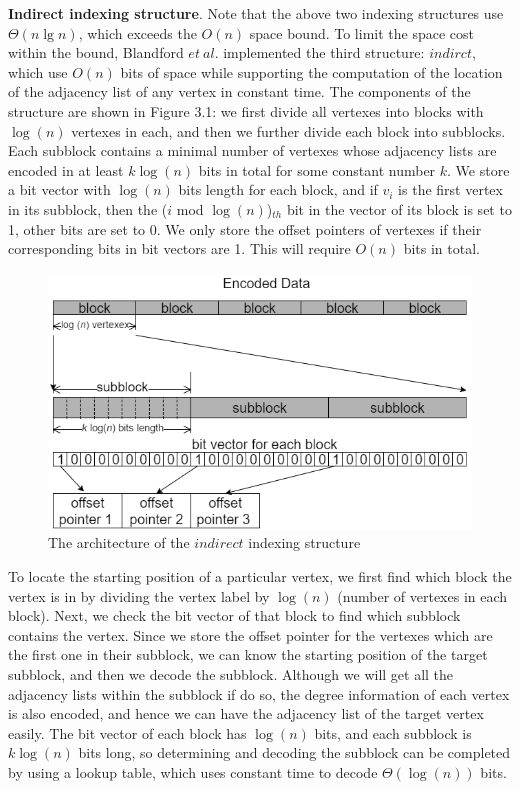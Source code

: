 \documentclass[12pt,glossary]{dalthesis}
\begin{document}
\textbf{Indirect indexing structure}. Note that the above two indexing structures use $ \Theta (n\lg n)$, which exceeds the $O(n)$ space bound. To limit the space cost within the bound, Blandford $et \ al.$ implemented the third structure: $indirct$, which use $O(n)$ bits of space while supporting the computation of the location of the adjacency list of any vertex in constant time. The components of the structure are shown in  Figure 3.1: we first divide all vertexes into blocks with $\log(n)$ vertexes in each, and then we further divide each block into subblocks. Each subblock contains a minimal number of vertexes whose adjacency lists are encoded in at least $k\log(n)$ bits in total for some constant number $k$. We store a bit vector with $\log(n)$ bits length for each block, and if $v_{i}$ is the first vertex in its subblock, then the ($i$ mod $\log (n)$)$_{th}$ bit in the vector of its block is set to 1, other bits are set to 0. We only store the offset pointers of vertexes if their corresponding bits in bit vectors are 1. This will require $O(n)$ bits in total. 

\bigskip

\begin{figure}[ht]
\centering
\includegraphics[width=1.0\textwidth]{indirect}
\caption{The architecture of the $indirect$ indexing structure}
\end{figure}

\bigskip

To locate the starting position of a particular vertex, we first find which block the vertex is in by dividing the vertex label by $\log(n)$ (number of vertexes in each block). Next, we check the bit vector of that block to find which subblock contains the vertex. Since we store the offset pointer for the vertexes which are the first one in their subblock, we can know the starting position of the target subblock, and then we decode the subblock. Although we will get all the adjacency lists within the subblock if do so, the degree information of each vertex is also encoded, and hence we can have the adjacency list of the target vertex easily. The bit vector of each block has $\log(n)$ bits, and each subblock is $k\log(n)$ bits long, so determining and decoding the subblock can be completed by using a lookup table, which uses constant time to decode $\Theta(\log(n))$ bits.              
\end{document}
